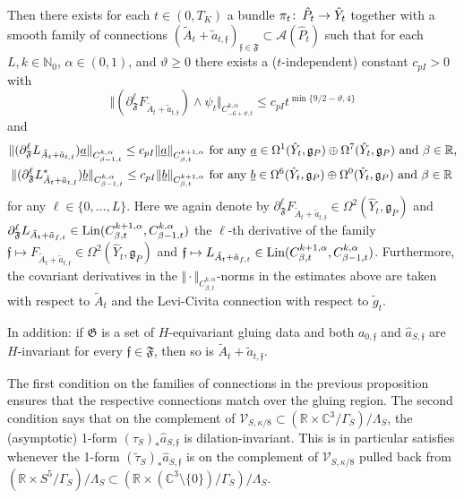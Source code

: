 \documentclass[11pt,a4paper]{scrartcl}
\newcommand{\col}{\colon \thinspace}
\newcommand{\VertWHt}[3]{\Vert_{C^{{#1},\alpha}_{{#2},t}{#3}}}
\numberwithin{equation}{section}
\theoremstyle{plain}
\theoremstyle{definition}
\theoremstyle{remark}
\begin{document}
\begin{proposition}
Then there exists for each $t \in (0,T_K)$ a bundle $\pi_t \col \hat{P}_t \to \hat{Y}_t$ together with a smooth family of connections $(\tilde{A}_{t} + \tilde{a}_{t,\mathfrak{f}})_{\mathfrak{f} \in \mathfrak{F}} \subset \mathcal{A}(\hat{P}_t)$ such that for each $L,k\in \mathbb{N}_0$, $\alpha \in (0,1)$, and $\vartheta\geq 0$ there exists a ($t$-independent) constant $c_{pI}>0$ with \[ \Vert (\partial_\mathfrak{F}^\ell F_{\tilde{A}_t + \tilde{a}_{t,\mathfrak{f}}}) \wedge \psi_t \VertWHt{k}{-6+\vartheta}{} \leq c_{pI} t^{\min\{9/2-\vartheta,4\}} \] and 
\begin{align*}
\Vert (\partial_\mathfrak{F}^\ell L_{\tilde{A}_t+\tilde{a}_{t,\mathfrak{f}}}) \underline{a} \VertWHt{k}{\beta-1}{} \leq c_{pI} \Vert \underline{a} \VertWHt{k+1}{\beta}{} &\textup{ for any $\underline{a} \in \Omega^1(\hat{Y}_t,\mathfrak{g}_P)\oplus \Omega^7(\hat{Y}_t,\mathfrak{g}_P)$ and $\beta \in \mathbb{R}$,}\\
\Vert (\partial_\mathfrak{F}^\ell L^*_{\tilde{A}_t+\tilde{a}_{t,\mathfrak{f}}}) \underline{b} \VertWHt{k}{\beta-1}{} \leq c_{pI} \Vert \underline{b} \VertWHt{k+1}{\beta}{} &\textup{ for any $\underline{b} \in \Omega^6(\hat{Y}_t,\mathfrak{g}_P)\oplus \Omega^0(\hat{Y}_t,\mathfrak{g}_P)$ and $\beta \in \mathbb{R}$}
\end{align*} 
for any $\ell \in \{0,\dots, L\}$. Here we again denote by $\partial_{\mathfrak{F}}^\ell F_{\tilde{A}_t + \tilde{a}_{t,\mathfrak{f}}}\in \Omega^2(\hat{Y}_t,\mathfrak{g}_P)$ and $\partial_{\mathfrak{F}}^\ell L_{\tilde{A}_{t}+\tilde{a}_{f,t}} \in \textup{Lin}(C^{k+1,\alpha}_{\beta,t},C^{k,\alpha}_{\beta-1,t})$ the $\ell$-th derivative of the family $\mathfrak{f} \mapsto F_{\tilde{A}_t + \tilde{a}_{t,\mathfrak{f}}} \in \Omega^2(\hat{Y}_t,\mathfrak{g}_P)$ and $\mathfrak{f} \mapsto L_{\tilde{A}_{t}+\tilde{a}_{f,t}} \in \textup{Lin}(C^{k+1,\alpha}_{\beta,t},C^{k,\alpha}_{\beta-1,t})$. Furthermore, the covariant derivatives in the $\Vert \cdot \VertWHt{k}{\beta}{}$-norms in the estimates above are taken with respect to $\tilde{A}_t$ and the Levi-Civita connection with respect to $\tilde{g}_t$. 

In addition: if $\mathfrak{G}$ is a set of $H$-equivariant gluing data and both $a_{0,\mathfrak{f}}$ and $\hat{a}_{S,\mathfrak{f}}$ are $H$-invariant for every $\mathfrak{f} \in \mathfrak{F}$, then so is $\tilde{A}_t+\tilde{a}_{t,\mathfrak{f}}$.
\end{proposition}
\begin{remark}
The first condition on the families of connections in the previous proposition ensures that the respective connections match over the gluing region. The second condition says that on the complement of $\mathcal{V}_{S,\kappa/8} \subset (\mathbb{R}\times \mathbb{C}^3/\Gamma_S)/\Lambda_S$, the (asymptotic) 1-form $(\tau_S)_* \hat{a}_{S,\mathfrak{f}}$ is dilation-invariant. This is in particular satisfies whenever the 1-form $(\tilde{\tau}_S)_*\hat{a}_{S,\mathfrak{f}}$ is on the complement of $\mathcal{V}_{S,\kappa/8}$ pulled back from $(\mathbb{R}\times S^5/\Gamma_S)/\Lambda_S \subset(\mathbb{R}\times (\mathbb{C}^3\setminus \{0\})/\Gamma_S)/\Lambda_S$.
\end{remark}
\end{document}
